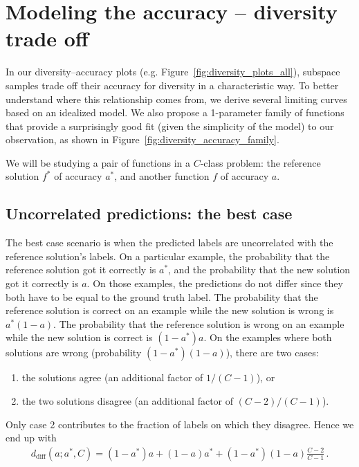 \documentclass{article}
\newcommand{\reducevspace}{\vspace{-1em}} %
\begin{document}
\reducevspace
\section{Modeling the accuracy -- diversity trade off}
\label{sec:limit:curves}
%
In our diversity--accuracy plots (e.g. Figure~\ref{fig:diversity_plots_all}), subspace samples trade off their accuracy for diversity in a characteristic way. To better understand where this relationship comes from, we derive  several limiting curves based on an idealized model. We also propose a 1-parameter family of functions that provide a surprisingly good fit (given the simplicity of the model) to our observation, as shown in Figure~\ref{fig:diversity_accuracy_family}. %

We will be studying a pair of functions in a $C$-class problem: the reference solution $f^*$ of accuracy $a^*$, and another function $f$ of accuracy $a$.


\subsection{Uncorrelated predictions: the %
best case}
The best case scenario is when the predicted labels are uncorrelated with the reference solution's labels. On a particular example, the probability that the reference solution got it correctly is $a^*$, and the probability that the new solution got it correctly is $a$. On those examples, the predictions do not differ since they both have to be equal to the ground truth label. The probability that the reference solution is correct on an example while the new solution is wrong is $a^* (1-a)$. The probability that the reference solution is wrong on an example while the new solution is correct is $(1-a^*) a$. 
%
On the examples where both solutions are wrong (probability $(1-a^*)(1-a)$), there are two cases: 
\vspace{-0.5em}
\begin{enumerate}[itemsep=0em,leftmargin=25pt]
\item the  solutions agree (an additional factor of $1/(C-1)$), or 
\item the two solutions disagree (an additional factor of $(C-2)/(C-1)$).
\end{enumerate}
Only case 2 
%
contributes to the fraction of labels on which they disagree. Hence we end up with
\begin{align}
%
d_{\mathrm{diff}}(a; a^*, C) 
%
= (1-a^*)a + (1-a)a^* + (1-a^*)(1-a) \frac{C-2}{C-1} \, . \nonumber
\end{align}
\end{document}
